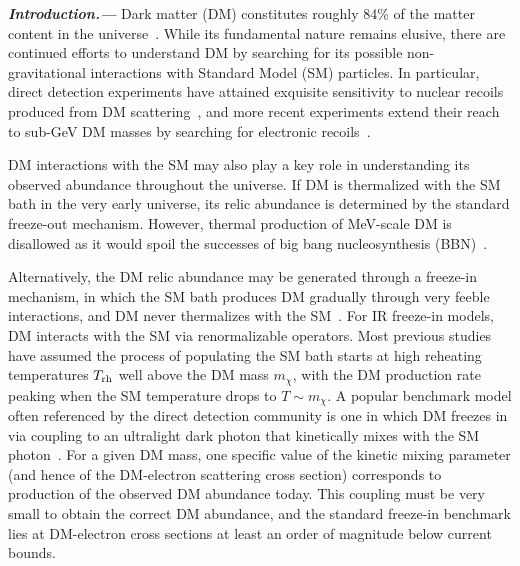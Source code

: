 \documentclass[notitlepage,nofootinbib,preprintnumbers,aps,superscriptaddress,twocolumn]{revtex4-1}
\begin{document}
\textbf{\textit{Introduction.---}} Dark matter (DM) constitutes roughly 84\% of  the matter content in the universe~\cite{Planck:2018vyg}. While its fundamental nature remains elusive, there are continued efforts to understand DM by searching for its possible non-gravitational interactions with Standard Model (SM) particles. In particular, direct detection experiments have attained exquisite sensitivity to nuclear recoils produced from DM scattering~\cite{PandaX-II:2017hlx,XENON:2018voc,Hambye:2018dpi,LZ:2022lsv}, and more recent experiments extend their reach to sub-GeV DM masses by searching for electronic recoils~\cite{PandaX-II:2017hlx,PandaX:2022xqx,DAMIC-M:2023gxo,DAMIC-M:2023hgj,SENSEI:2020dpa,DarkSide:2022knj,XENON:2018voc}.

DM interactions with the SM may also play a key role in understanding its observed abundance throughout the universe. If DM is thermalized with the SM bath in the very early universe, its relic abundance is determined by the standard freeze-out mechanism. However, thermal production of MeV-scale DM is disallowed as it would spoil the successes of big bang nucleosynthesis (BBN)~\cite{Boehm:2013jpa,Nollett:2013pwa,Steigman:2014pfa,An:2022sva}.

Alternatively, the DM relic abundance may be generated through a freeze-in mechanism, in which the SM bath produces DM gradually through very feeble interactions, and DM never thermalizes with the SM~\cite{Hall:2009bx}. For IR freeze-in models, DM interacts with the SM via renormalizable operators. Most previous studies have assumed the process of populating the SM bath starts at high reheating temperatures $T_{\rm rh}$ well above the DM mass $m_\chi$, with the DM production rate peaking when the SM temperature drops to $T\sim m_\chi$. A popular benchmark model often referenced by the direct detection community is one in which DM freezes in via coupling to an ultralight dark photon that kinetically mixes with the SM photon~\cite{Hall:2009bx,Chu:2011be,Essig:2011nj,Chang:2019xva}. For a given DM mass, one specific value of the kinetic mixing parameter (and hence of the DM-electron scattering cross section) corresponds to production of the observed DM abundance today. This coupling must be very small to obtain the correct DM abundance, and the standard freeze-in benchmark lies at DM-electron cross sections at least an order of magnitude below current bounds.
\end{document}
